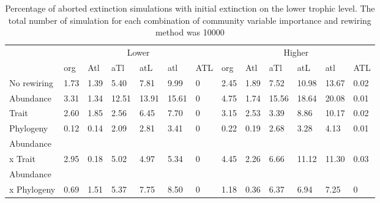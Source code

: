 \documentclass[12pt,a4paper]{article}
\begin{document}
\begin{landscape}
\begin{table}[H]
\centering
\caption{Percentage of aborted extinction simulations with initial extinction on the lower trophic level. The total number of simulation for each combination of community variable importance and rewiring method was 10000}
\label{tab:abort_perc}
\begin{tabularx}{\linewidth}{lllllllllllll}
\toprule
  & \multicolumn{6}{c}{Lower} & \multicolumn{6}{c}{Higher} \\ \cmidrule(l){2-7} \cmidrule(l){8-13}
 & org & Atl & aTl & atL & atl & ATL & org & Atl & aTl & atL & atl & ATL \\ \midrule
No rewiring & 1.73 & 1.39 & 5.40 & 7.81 & 9.99 & 0 & 2.45 & 1.89 & 7.52 & 10.98 & 13.67 & 0.02  \\
Abundance & 3.31 & 1.34 & 12.51 & 13.91 & 15.61 & 0 & 4.75 & 1.74 & 15.56 & 18.64 & 20.08 & 0.01 \\
Trait & 2.60 & 1.85 & 2.56 & 6.45 & 7.70 & 0 & 3.15 & 2.53 & 3.39 & 8.86 & 10.17 & 0.02 \\
Phylogeny & 0.12 & 0.14 & 2.09 & 2.81 & 3.41 & 0 & 0.22 & 0.19 & 2.68 & 3.28 & 4.13 & 0.01 \\
Abundance \\ x Trait & 2.95 & 0.18 & 5.02 & 4.97 & 5.34 & 0 & 4.45 & 2.26 & 6.66 & 11.12 & 11.30 & 0.03 \\
Abundance \\ x  Phylogeny & 0.69 & 1.51 & 5.37 & 7.75 & 8.50 & 0 & 1.18 & 0.36 & 6.37 & 6.94 & 7.25 & 0 \\ \bottomrule
\end{tabularx}%
\end{table}
\end{landscape}

\begin{multicols}{2}[\printbibheading]
\printbibliography[heading=none]
\end{multicols}
\end{document}
